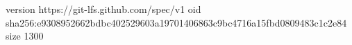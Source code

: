 version https://git-lfs.github.com/spec/v1
oid sha256:e9308952662bdbc402529603a19701406863c9bc4716a15fbd0809483c1c2e84
size 1300
